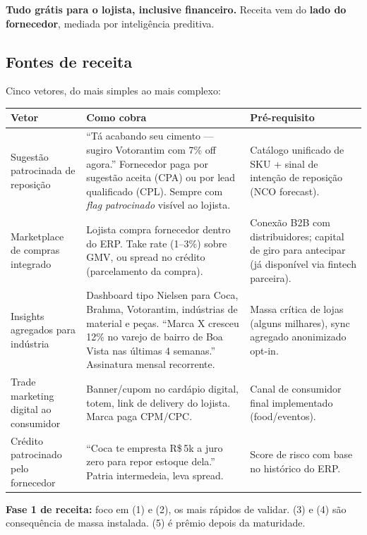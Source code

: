 \documentclass[11pt,a4paper]{article}
\begin{document}
\begin{notice}
\textbf{Tudo grátis para o lojista, inclusive financeiro.} Receita vem do
\textbf{lado do fornecedor}, mediada por inteligência preditiva.
\end{notice}

\subsection{Fontes de receita}

Cinco vetores, do mais simples ao mais complexo:

\begin{longtable}{@{}p{2.7cm}p{6.5cm}p{5.5cm}@{}}
\toprule
\textbf{Vetor} & \textbf{Como cobra} & \textbf{Pré-requisito} \\
\midrule
\endhead
Sugestão patrocinada de reposição & ``Tá acabando seu cimento --- sugiro
Votorantim com 7\% off agora.'' Fornecedor paga por sugestão aceita (CPA) ou
por lead qualificado (CPL). Sempre com \emph{flag patrocinado} visível ao
lojista. & Catálogo unificado de SKU + sinal de intenção de reposição (NCO
forecast). \\
\addlinespace
Marketplace de compras integrado & Lojista compra fornecedor dentro do ERP.
Take rate (1--3\%) sobre GMV, ou spread no crédito (parcelamento da compra).
& Conexão B2B com distribuidores; capital de giro para antecipar (já
disponível via fintech parceira). \\
\addlinespace
Insights agregados para indústria & Dashboard tipo Nielsen para Coca,
Brahma, Votorantim, indústrias de material e peças. ``Marca X cresceu 12\% no
varejo de bairro de Boa Vista nas últimas 4 semanas.'' Assinatura mensal
recorrente. & Massa crítica de lojas (alguns milhares), sync agregado
anonimizado opt-in. \\
\addlinespace
Trade marketing digital ao consumidor & Banner/cupom no cardápio digital,
totem, link de delivery do lojista. Marca paga CPM/CPC. & Canal de
consumidor final implementado (food/eventos). \\
\addlinespace
Crédito patrocinado pelo fornecedor & ``Coca te empresta R\$\,5k a juro
zero para repor estoque dela.'' Patria intermedeia, leva spread. & Score de
risco com base no histórico do ERP. \\
\bottomrule
\end{longtable}

\textbf{Fase 1 de receita:} foco em (1) e (2), os mais rápidos de validar.
(3) e (4) são consequência de massa instalada. (5) é prêmio depois da
maturidade.
\end{document}
